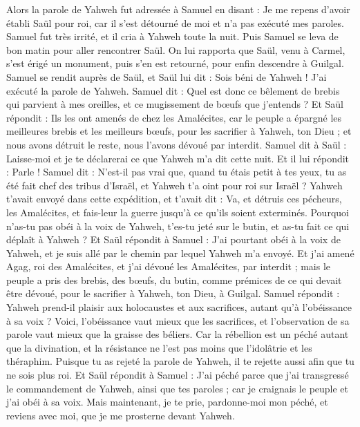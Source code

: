 \begin{multicols}{2}
Alors la parole de Yahweh fut adressée à Samuel en disant :
Je me repens d'avoir établi Saül pour roi, car il s'est détourné de moi et n'a pas exécuté mes paroles. Samuel fut très irrité, et il cria à Yahweh toute la nuit.
Puis Samuel se leva de bon matin pour aller rencontrer Saül. On lui rapporta que Saül, venu à Carmel, s'est érigé un monument, puis s'en est retourné, pour enfin descendre à Guilgal.
Samuel se rendit auprès de Saül, et Saül lui dit : Sois béni de Yahweh ! J'ai exécuté la parole de Yahweh.
Samuel dit : Quel est donc ce bêlement de brebis qui parvient à mes oreilles, et ce mugissement de bœufs que j'entends ?
Et Saül répondit : Ils les ont amenés de chez les Amalécites, car le peuple a épargné les meilleures brebis et les meilleurs bœufs, pour les sacrifier à Yahweh, ton Dieu ; et nous avons détruit le reste, nous l'avons dévoué par interdit.
Samuel dit à Saül : Laisse-moi et je te déclarerai ce que Yahweh m'a dit cette nuit. Et il lui répondit : Parle !
Samuel dit : N'est-il pas vrai que, quand tu étais petit à tes yeux, tu as été fait chef des tribus d'Israël, et Yahweh t'a oint pour roi sur Israël ?
Yahweh t'avait envoyé dans cette expédition, et t'avait dit : Va, et détruis ces pécheurs, les Amalécites, et fais-leur la guerre jusqu'à ce qu'ils soient exterminés.
Pourquoi n'as-tu pas obéi à la voix de Yahweh, t'es-tu jeté sur le butin, et as-tu fait ce qui déplaît à Yahweh ?
Et Saül répondit à Samuel : J'ai pourtant obéi à la voix de Yahweh, et je suis allé par le chemin par lequel Yahweh m'a envoyé. Et j'ai amené Agag, roi des Amalécites, et j'ai dévoué les Amalécites, par interdit ;
mais le peuple a pris des brebis, des bœufs, du butin, comme prémices de ce qui devait être dévoué, pour le sacrifier à Yahweh, ton Dieu, à Guilgal.
Samuel répondit : Yahweh prend-il plaisir aux holocaustes et aux sacrifices, autant qu'à l'obéissance à sa voix ? Voici, l'obéissance vaut mieux que les sacrifices, et l'observation de sa parole vaut mieux que la graisse des béliers.
Car la rébellion est un péché autant que la divination, et la résistance ne l'est pas moins que l'idolâtrie et les théraphim. Puisque tu as rejeté la parole de Yahweh, il te rejette aussi afin que tu ne sois plus roi.
Et Saül répondit à Samuel : J'ai péché parce que j'ai transgressé le commandement de Yahweh, ainsi que tes paroles ; car je craignais le peuple et j'ai obéi à sa voix.
Mais maintenant, je te prie, pardonne-moi mon péché, et reviens avec moi, que je me prosterne devant Yahweh.

\end{multicols}
